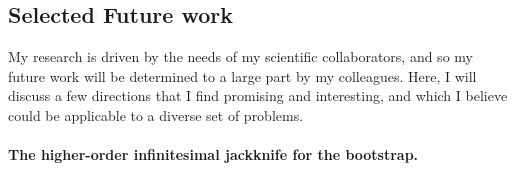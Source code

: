 %


%
%
%
\subsection*{Selected Future work}

My research is driven by the needs of my scientific collaborators, and
so my future work will be determined to a large part by my colleagues.
Here, I will discuss a few directions that I find promising and interesting,
and which I believe could be applicable to a diverse set of problems.

\paragraph{The higher-order infinitesimal jackknife for the bootstrap.}

